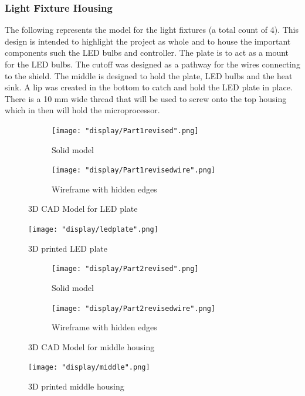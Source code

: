 \documentclass[12pt,a4paper]{report}
\begin{document}
\subsubsection{Light Fixture Housing}
The following represents the model for the light fixtures (a total count of 4). This design is intended to highlight the project as whole and to house the important components such the LED bulbs and controller. The plate is to act as a mount for the LED bulbs. The cutoff was designed as a pathway for the wires connecting to the shield. The middle is designed to hold the plate, LED bulbs and the heat sink. A lip was created in the bottom to catch and hold the LED plate in place. There is a 10 mm wide thread that will be used to screw onto the top housing which in then will hold the microprocessor.
\begin{figure}[H]
\centering
\begin{subfigure}{.5\textwidth}
  \centering
  \texttt{[image: "display/Part1revised".png]}
  \caption{Solid model}
  \label{fig:sub1}
\end{subfigure}%
\begin{subfigure}{.5\textwidth}
  \centering
  \texttt{[image: "display/Part1revisedwire".png]}
  \caption{Wireframe with hidden edges}
  \label{fig:sub2}
\end{subfigure}
\caption{3D CAD Model for LED plate}
\label{fig:test}
\end{figure}
\begin{figure}[H]
	\centering
	\texttt{[image: "display/ledplate".png]}\par			
	\vspace{0.1cm}
	\caption{3D printed LED plate}
\end{figure}
\begin{figure}[H]
\centering
\begin{subfigure}{.5\textwidth}
  \centering
  \texttt{[image: "display/Part2revised".png]}
  \caption{Solid model}
  \label{fig:sub1}
\end{subfigure}%
\begin{subfigure}{.5\textwidth}
  \centering
  \texttt{[image: "display/Part2revisedwire".png]}
  \caption{Wireframe with hidden edges}
  \label{fig:sub2}
\end{subfigure}
\caption{3D CAD Model for middle housing}
\label{fig:test}
\end{figure}
\begin{figure}[H]
	\centering
	\texttt{[image: "display/middle".png]}\par			
	\vspace{0.1cm}
	\caption{3D printed middle housing}
\end{figure}
\end{document}
